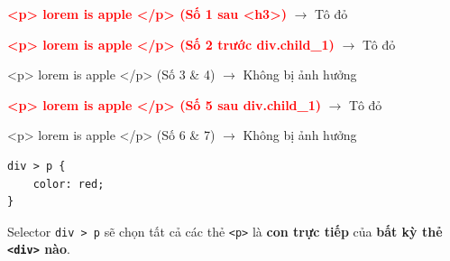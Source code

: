 \documentclass[11pt,oneside]{book}
\newcommand{\codeinline}[1]{\textcolor{accentOrange}{\texttt{#1}}}
\begin{document}
\begin{browserWindow}
\sffamily\small
\begin{tcolorbox}[arc=2pt, colback=primaryBlue!5, colframe=primaryBlue!40, boxrule=1pt, title={\sffamily\small\color{white}\textbf{.Parent}}, colbacktitle=primaryBlue!70]
\textcolor{red}{\textbf{<p> lorem is apple </p> (Số 1 sau <h3>)}} $\rightarrow$ Tô đỏ \par\vspace{2pt}
\textcolor{red}{\textbf{<p> lorem is apple </p> (Số 2 trước div.child\_1)}} $\rightarrow$ Tô đỏ \par\vspace{3pt}
\begin{tcolorbox}[arc=2pt, colback=white, colframe=gray!30, boxrule=1pt, title={\sffamily\scriptsize\color{darkText}.child\_1}]
<p> lorem is apple </p> (Số 3 \& 4) $\rightarrow$ Không bị ảnh hưởng
\end{tcolorbox}\vspace{3pt}
\textcolor{red}{\textbf{<p> lorem is apple </p> (Số 5 sau div.child\_1)}} $\rightarrow$ Tô đỏ \par\vspace{3pt}
\begin{tcolorbox}[arc=2pt, colback=white, colframe=gray!30, boxrule=1pt, title={\sffamily\scriptsize\color{darkText}.child\_2}]
<p> lorem is apple </p> (Số 6 \& 7) $\rightarrow$ Không bị ảnh hưởng
\end{tcolorbox}
\end{tcolorbox}
\end{browserWindow}

\begin{codeWindow}
\begin{lstlisting}[language=CSS3]
div > p {
    color: red;
}
\end{lstlisting}
\end{codeWindow}

\begin{conceptBox}
Selector \codeinline{div > p} sẽ chọn tất cả các thẻ \codeinline{<p>} là \textbf{con trực tiếp} của \textbf{bất kỳ thẻ \codeinline{<div>} nào}.
\end{conceptBox}
\end{document}
